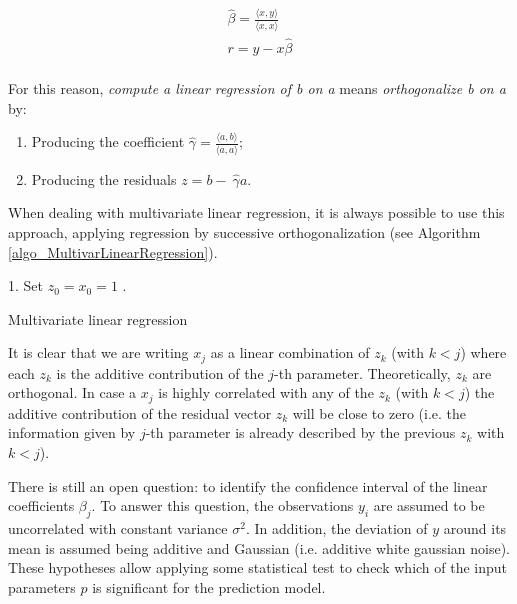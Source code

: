 \begin{equation}
\begin{split}
\hat{\beta}=\frac{\langle x,y \rangle}{\langle x,x \rangle}\\
r=y-x\hat{\beta}\\
\end{split}
\label{eq_OLSgeo4}
\end{equation}

For this reason, \textit{compute a linear regression of b on a} means \textit{orthogonalize b on a} by:
\begin{enumerate}
    \item Producing the coefficient $\hat{\gamma}=\frac{\langle a,b \rangle}{\langle a,a \rangle}$;
    \item 	Producing the residuals $z=b-\ \hat{\gamma}a$.
\end{enumerate}

When dealing with multivariate linear regression, it is always possible to use this approach, applying regression by successive orthogonalization (see Algorithm \ref{algo_MultivarLinearRegression}).

\begin{algorithm}[H]
\DontPrintSemicolon
\SetAlgoLined
    
    1. 	Set $z_0=x_0=1$ . 
    
\caption{Multivariate linear regression}
\label{algo_MultivarLinearRegression}        
\end{algorithm}

It is clear that we are writing $x_j$ as a linear combination of $z_k$ (with $k<j$) where each $z_k$ is the additive contribution of the $j$-th parameter. Theoretically, $z_k$ are orthogonal. In case a $x_j$ is highly correlated with any of the $z_k$ (with $k<j$) the additive contribution of the residual vector $z_k$ will be close to zero (i.e. the information given by $j$-th parameter is already described by the previous $z_k$ with $k<j$).\par

There is still an open question: to identify the confidence interval of the linear coefficients $\beta_j$. To answer this question, the observations $y_i$ are assumed to be uncorrelated with constant variance $\sigma^2$. In addition, the deviation of $y$ around its mean is assumed being additive and Gaussian (i.e. additive white gaussian noise). These hypotheses allow applying some statistical test to check which of the input parameters $p$ is significant for the prediction model.\par

